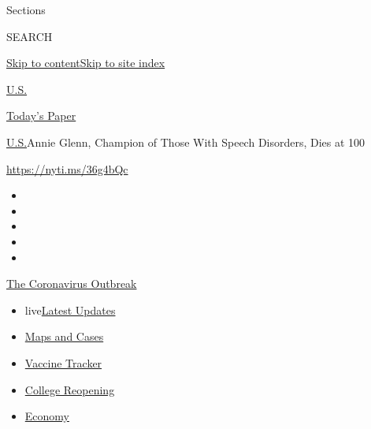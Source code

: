 Sections

SEARCH

\protect\hyperlink{site-content}{Skip to
content}\protect\hyperlink{site-index}{Skip to site index}

\href{https://www.nytimes.com/section/us}{U.S.}

\href{https://myaccount.nytimes.com/auth/login?response_type=cookie\&client_id=vi}{}

\href{https://www.nytimes.com/section/todayspaper}{Today's Paper}

\href{/section/us}{U.S.}\textbar{}Annie Glenn, Champion of Those With
Speech Disorders, Dies at 100

\url{https://nyti.ms/36g4bQc}

\begin{itemize}
\item
\item
\item
\item
\item
\end{itemize}

\href{https://www.nytimes.com/news-event/coronavirus?action=click\&pgtype=Article\&state=default\&region=TOP_BANNER\&context=storylines_menu}{The
Coronavirus Outbreak}

\begin{itemize}
\tightlist
\item
  live\href{https://www.nytimes.com/2020/08/03/world/coronavirus-covid-19.html?action=click\&pgtype=Article\&state=default\&region=TOP_BANNER\&context=storylines_menu}{Latest
  Updates}
\item
  \href{https://www.nytimes.com/interactive/2020/us/coronavirus-us-cases.html?action=click\&pgtype=Article\&state=default\&region=TOP_BANNER\&context=storylines_menu}{Maps
  and Cases}
\item
  \href{https://www.nytimes.com/interactive/2020/science/coronavirus-vaccine-tracker.html?action=click\&pgtype=Article\&state=default\&region=TOP_BANNER\&context=storylines_menu}{Vaccine
  Tracker}
\item
  \href{https://www.nytimes.com/2020/08/02/us/covid-college-reopening.html?action=click\&pgtype=Article\&state=default\&region=TOP_BANNER\&context=storylines_menu}{College
  Reopening}
\item
  \href{https://www.nytimes.com/live/2020/08/03/business/stock-market-today-coronavirus?action=click\&pgtype=Article\&state=default\&region=TOP_BANNER\&context=storylines_menu}{Economy}
\end{itemize}

